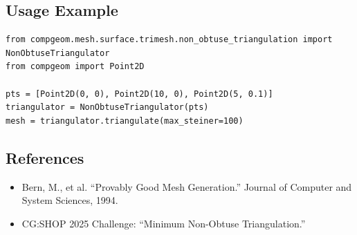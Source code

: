 \subsection{Usage Example}

\begin{verbatim}
from compgeom.mesh.surface.trimesh.non_obtuse_triangulation import NonObtuseTriangulator
from compgeom import Point2D

pts = [Point2D(0, 0), Point2D(10, 0), Point2D(5, 0.1)]
triangulator = NonObtuseTriangulator(pts)
mesh = triangulator.triangulate(max_steiner=100)
\end{verbatim}

\subsection{References}

\begin{itemize}
\item Bern, M., et al. ``Provably Good Mesh Generation.'' Journal of Computer and System Sciences, 1994.
\item CG:SHOP 2025 Challenge: ``Minimum Non-Obtuse Triangulation.''
\end{itemize}


\endinput

\chapter{Voronoi Diagrams}
\label{ch:voronoi_diagrams}

\section{Voronoi Diagram}
\label{sec:voronoi_diagram}

A Voronoi diagram\index{Voronoi diagram} is a fundamental partition of a plane into regions based on distance to a specific set of points, called sites. For each site, there is a corresponding region (Voronoi cell) consisting of all points closer to that site than to any other. The concept was introduced by Voronoi in 1908~\cite{voronoi1908}. The Voronoi diagram is the geometric dual of the Delaunay triangulation, a property that allows for efficient construction. Efficient algorithms include the sweepline approach of Fortune~\cite{fortune1987}, and a comprehensive survey is given by Aurenhammer~\cite{aurenhammer1991}.

